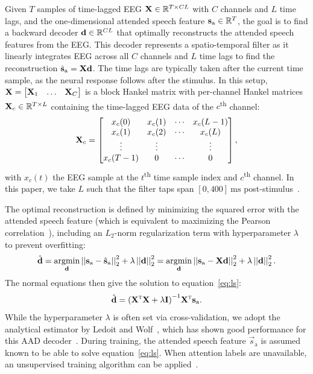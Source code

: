 \documentclass[fleqn,10pt]{wlscirep}
\begin{document}
	Given $T$ samples of time-lagged EEG $\mat{X} \in \R^{T \times CL}$ with $C$ channels and $L$ time lags, and the one-dimensional attended speech feature $\vec{s}_{\text{a}} \in \R^T$, the goal is to find a backward decoder $\vec{d} \in \R^{CL}$ that optimally reconstructs the attended speech features from the EEG. This decoder represents a spatio-temporal filter as it linearly integrates EEG across all $C$ channels and $L$ time lags to find the reconstruction $\hat{\vec{s}}_{\text{a}} = \mat{X}\vec{d}$. The time lags are typically taken after the current time sample, as the neural response follows after the stimulus. In this setup, $\mat{X} = \begin{bmatrix}
		\mat{X}_1 & \dots & \mat{X}_C \end{bmatrix}$ is a block Hankel matrix with per-channel Hankel matrices $\mat{X}_c \in \R^{T \times L}$ containing the time-lagged EEG data of the $c$\textsuperscript{th} channel:
	\[ \mat{X}_{c} = \begin{bmatrix}
		x_{c}(0) & x_{c}(1) & \cdots & x_{c}(L-1) \\
		x_{c}(1) & x_{c}(2) & \cdots & x_{c}(L) \\
		\vdots & \vdots &  & \vdots \\
		x_{c}(T-1) & 0 & \cdots & 0\\
	\end{bmatrix},
	\]
	with $x_c(t)$ the EEG sample at the $t$\textsuperscript{th} time sample index and $c$\textsuperscript{th} channel. In this paper, we take $L$ such that the filter taps span $[0,400]\SI{}{\milli\second}$ post-stimulus~\cite{geirnaert2022timeAdaptive}.
	
	The optimal reconstruction is defined by minimizing the squared error with the attended speech feature (which is equivalent to maximizing the Pearson correlation~\cite{biesmans2017auditory}), including an $L_2$-norm regularization term with hyperparameter $\lambda$ to prevent overfitting:
	\begin{equation}
		\label{eq:ls}
		\hat{\vec{d}} = \underset{\vec{d}}{\text{argmin}} \norm{\vec{s}_{\text{a}}-\hat{\vec{s}}_{\text{a}}}_2^2 + \lambda\norm{\vec{d}}_2^2 = \underset{\vec{d}}{\text{argmin}} \norm{\vec{s}_{\text{a}}-\mat{X}\vec{d}}_2^2+ \lambda\norm{\vec{d}}_2^2.
	\end{equation}
	The normal equations then give the solution to equation~\eqref{eq:ls}:
	\[
	\hat{\vec{d}} = \inverse{\left(\transpose{\mat{X}}\mat{X}+\lambda \mat{I}\right)}\transpose{\mat{X}}\vec{s}_{\text{a}}.
	\]
	While the hyperparameter $\lambda$ is often set via cross-validation, we adopt the analytical estimator by Ledoit and Wolf~\cite{ledoit2004well}, which has shown good performance for this AAD decoder~\cite{geirnaert2021unsupervised,geirnaert2022timeAdaptive}. During training, the attended speech feature $\vec{s}_{\text{a}}$ is assumed known to be able to solve equation~\eqref{eq:ls}. When attention labels are unavailable, an unsupervised training algorithm can be applied~\cite{geirnaert2021unsupervised,geirnaert2022timeAdaptive}.
	
\end{document}
